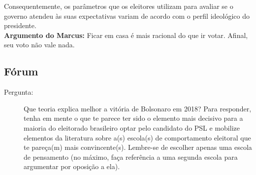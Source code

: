 \noindent Consequentemente, os parâmetros que os eleitores utilizam para avaliar se o governo atendeu às suas expectativas variam de acordo com o perfil ideológico do presidente. \\

\noindent \textbf{Argumento do Marcus:} Ficar em casa é mais racional do que ir votar. Afinal, seu voto não vale nada. 

\subsection{Fórum}

\begin{description}
    \item [Pergunta:] Que teoria explica melhor a vitória de Bolsonaro em 2018? Para responder, tenha em mente o que te parece ter sido o elemento mais decisivo para a maioria do eleitorado brasileiro optar pelo candidato do PSL e mobilize elementos da literatura sobre a(s) escola(s) de comportamento eleitoral que te pareça(m) mais convincente(s). Lembre-se de escolher apenas uma escola de pensamento (no máximo, faça referência a uma segunda escola para argumentar por oposição a ela).
\end{description}
